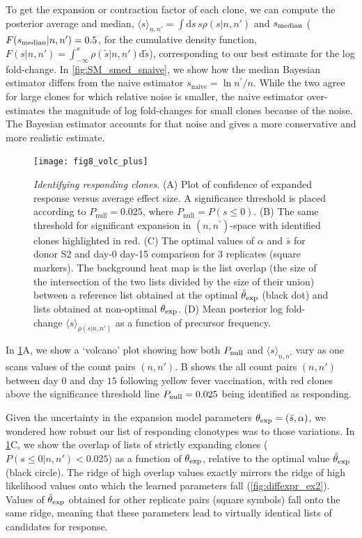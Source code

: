 \documentclass[pre,twocolumn,english,longbibliography]{revtex4}
\newcommand{\<}{\langle}
\renewcommand{\>}{\rangle}
\begin{document}
To get the expansion or contraction factor of each clone, we can compute the posterior average and median, $\<s\>_{n,n'}=\int \textrm{d}s\,s \rho(s|n,n')$ and $s_{\rm median}$ ($F(s_{\rm median}|n,n')=0.5$, for the cumulative density function, $F(s|n,n')=\int_{-\infty}^s\rho(\tilde{s}|n,n')\textrm{d}\tilde{s}$),  corresponding to our best estimate for the log fold-change.
In \cref{fig:SM_smed_snaive}, we show how the median Bayesian estimator differs from the naive estimator $s_{\textrm{naive}}=\ln n^{\prime}/n$. While the two agree for large clones for which relative noise is smaller, the naive estimator over-estimates the magnitude of log fold-changes for small clones because of the noise. The Bayesian estimator accounts for that noise and gives a more conservative and more realistic estimate.

\begin{figure}
\texttt{[image: fig8\_volc\_plus]}
\centering{}
\caption{
\emph{Identifying responding clones}. (A) Plot of confidence of expanded response versus average effect size. A significance threshold is placed according to $P_{\textrm{null}}=0.025$, where $P_{\textrm{null}}=P(s\leq 0)$. (B) The same threshold for significant expansion in $(n,n^\prime)$-space with identified clones highlighted in red. (C) The optimal values of $\alpha$ and $\bar{s}$ for donor S2 and day-0 day-15 comparison for 3 replicates (square markers). The background heat map is the list overlap (the size of the intersection of the two lists divided by the size of their union) between a reference list obtained at the optimal $\hat\theta_{\rm exp}$ (black dot) and lists obtained at non-optimal $\theta_{\rm exp}$. (D) Mean posterior log fold-change $\<s\>_{\rho(s|n,n')}$ as a function of precursor frequency.
\label{fig:volcano}}
\end{figure}

In \cref{fig:volcano}A, we show a `volcano' plot showing how both $P_{\rm null}$ and $\<s\>_{n,n'}$ vary as one scans values of the count pairs $(n,n')$. B shows the all count pairs $(n,n')$ between day $0$ and day $15$ following yellow fever vaccination, with red clones above the significance threshold line $P_{\rm null}=0.025$ being identified as responding.

Given the uncertainty in the expansion model parameters $\theta_{\rm exp}=(\bar s,\alpha)$, we wondered how robust our list of responding clonotypes was to those variations. In \cref{fig:volcano}C, we show the overlap of lists of strictly expanding clones ($P(s\leq 0|n,n')<0.025$) as a function of $\theta_{\rm exp}$, relative to the optimal value $\hat\theta_{\rm exp}$ (black circle). The ridge of high overlap values exactly mirrors the ridge of high likelihood values onto which the learned parameters fall (\cref{fig:diffexpr_ex2}). Values of $\hat \theta_{\rm exp}$ obtained for other replicate pairs (square symbols) fall onto the same ridge, meaning that these parameters lead to virtually identical lists of candidates for response.
\end{document}
